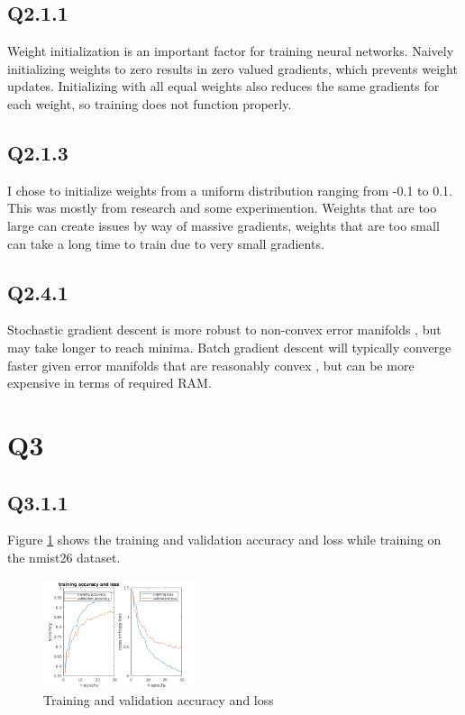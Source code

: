 \documentclass[12pt]{article}
\begin{document}
\subsection{Q2.1.1}
Weight initialization is an important factor for training neural networks. Naively initializing weights to zero results in zero valued gradients, which prevents weight updates. Initializing with all equal weights also reduces the same gradients for each weight, so training does not function properly. 

\subsection{Q2.1.3}
I chose to initialize weights from a uniform distribution ranging from -0.1 to 0.1. This was mostly from research and some experimention. Weights that are too large can create issues by way of massive gradients, weights that are too small can take a long time to train due to very small gradients.


\subsection{Q2.4.1}
Stochastic gradient descent is more robust to non-convex error manifolds , but may take longer to reach minima. Batch gradient descent will typically converge faster given error manifolds that are reasonably convex , but can be more expensive in terms of required RAM.

\section{Q3}
\subsection{Q3.1.1}
Figure \ref{fig:accloss} shows the training and validation accuracy and loss while training on the nmist26 dataset.
\begin{figure}[H]
\centering
\includegraphics[page=1,width=0.4\textwidth]{q311}
\caption{Training and validation accuracy and loss} 
\label{fig:accloss}
\end{figure}   
\end{document}
